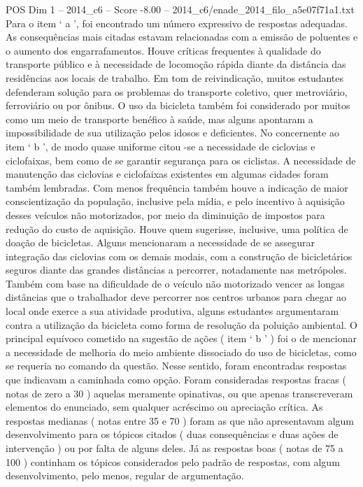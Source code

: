 \begin{textsample}{POS Dim 1 – 2014\_c6 – Score -8.00 – 2014\_c6/enade\_2014\_filo\_a5e07f71a1.txt}
Para o item ‘ a ’, foi encontrado um número expressivo de respostas adequadas.
As consequências mais citadas estavam relacionadas com a emissão de poluentes e o aumento dos engarrafamentos.
Houve críticas frequentes à qualidade do transporte público e à necessidade de locomoção rápida diante da distância das residências aos locais de trabalho.
Em tom de reivindicação, muitos estudantes defenderam solução para os problemas do transporte coletivo, quer metroviário, ferroviário ou por ônibus.
O uso da bicicleta também foi considerado por muitos como um meio de transporte benéfico à saúde, mas alguns apontaram a impossibilidade de sua utilização pelos idosos e deficientes.
No concernente ao item ‘ b ’, de modo quase uniforme citou -se a necessidade de ciclovias e ciclofaixas, bem como de se garantir segurança para os ciclistas.
A necessidade de manutenção das ciclovias e ciclofaixas existentes em algumas cidades foram também lembradas.
Com menos frequência também houve a indicação de maior conscientização da população, inclusive pela mídia, e pelo incentivo à aquisição desses veículos não motorizados, por meio da diminuição de impostos para redução do custo de aquisição.
Houve quem sugerisse, inclusive, uma política de doação de bicicletas.
Alguns mencionaram a necessidade de se assegurar integração das ciclovias com os demais modais, com a construção de bicicletários seguros diante das grandes distâncias a percorrer, notadamente nas metrópoles.
Também com base na dificuldade de o veículo não motorizado vencer as longas distâncias que o trabalhador deve percorrer nos centros urbanos para chegar ao local onde exerce a sua atividade produtiva, alguns estudantes argumentaram contra a utilização da bicicleta como forma de resolução da poluição ambiental.
O principal equívoco cometido na sugestão de ações ( item ‘ b ’ ) foi o de mencionar a necessidade de melhoria do meio ambiente dissociado do uso de bicicletas, como se requeria no comando da questão.
Nesse sentido, foram encontradas respostas que indicavam a caminhada como opção.
Foram consideradas respostas fracas ( notas de zero a 30 ) aquelas meramente opinativas, ou que apenas transcreveram elementos do enunciado, sem qualquer acréscimo ou apreciação crítica.
As respostas medianas ( notas entre 35 e 70 ) foram as que não apresentavam algum desenvolvimento para os tópicos citados ( duas consequências e duas ações de intervenção ) ou por falta de alguns deles.
Já as respostas boas ( notas de 75 a 100 ) continham os tópicos considerados pelo padrão de respostas, com algum desenvolvimento, pelo menos, regular de argumentação.

\end{textsample}
